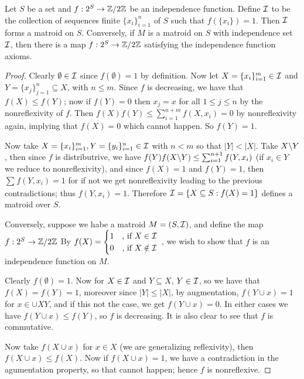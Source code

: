 \begin{theorem}\label{1.1.7}
    Let $S$ be a set and $f:2^S \rightarrow \mathbb{Z}/2\mathbb{Z}$ be an independence function. Define  $\mathcal{I}$ to be
    the collection of sequences finite $\{x_i\}_{i=1}^{n}$ of $S$ such that $f(\{x_i\})=1$. Then
    $\mathcal{I}$ forms a matroid on  $S$. Conversely, if  $M$ is a matroid on  $S$ with independence set
    $\mathcal{I}$, then there is a map $f:2^S \rightarrow \mathbb{Z}/2\mathbb{Z}$ satisfying the independence function
    axioms.
\end{theorem}
\begin{proof}
    Clearly $\emptyset \in \mathcal{I}$ since  $f(\emptyset)=1$ by definition. Now let $X=\{x_i\}_{i=1}^{m}
    \in \mathcal{I}$ and $Y=\{x_j\}_{j=1}^{n} \subseteq X$, with $n \leq m$. Since $f$ is decreasing, we have that  $f(X)
    \leq f(Y)$; now if $f(Y)=0$ then $x_j=x$ for all  $1 \leq j \leq n$ by the nonreflexivity of
    $f$. Then  $f(X)f(Y) \leq \sum_{i=1}^{n+m}{f(X,x_i)}=0$ by nonreflexivity again, implying that
    $f(X)=0$ which cannot happen. So $f(Y)=1$.

    Now take $X=\{x_i\}_{i=1}^{m}, Y=\{y_i\}_{i=1}^{n} \in \mathcal{I}$ with $n<m$ so that  $|Y|<|X|$. Take
    $X\backslash Y$, then since $f$ is distributrive, we have  $f(Y)f(X\backslash Y) \leq
    \sum_{i=1}^{n+1}{f(Y,x_i)}$ (if $x_i \in Y$ we reduce to nonreflexivity), and since $f(X)=1$ and
    $f(Y)=1$, then $\sum_{}{f(Y,x_i)}=1$ for if not we get nonreflexivity leading to the previous
    contradictions; thus $f(Y,x_i)=1$. Therefore $\mathcal{I}=\{X \subseteq S:f(X)=1\}$ defines a matroid 
    over $S$.

    Conversely, suppose we habe a matroid  $M=(S,\mathcal{I})$, and define the map $f:2^S \rightarrow
    \mathbb{Z}/2\mathbb{Z}$ By  $f(X)=\begin{cases}
                        1 & \text{, if } X \in \mathcal{I} \\
                        0 & \text{, if } X \notin \mathcal{I} \\
                      \end{cases}$
    , we wish to show that $f$ is an independence function on $M$.

    Clearly  $f(\emptyset)=1$. Now for $X \in \mathcal{I}$ and  $Y \subseteq X$,  $Y \in \mathcal{I}$, so we have
    that  $f(X)=f(Y)=1$, moreover since $|Y| \leq |X|$, by augmentation,  $f(Y \cup x)=1$ for $x \in
    \cup{X}{Y}$, and if this not the case, we get $f(Y \cup x)=0$. In either cases we have $f(Y \cup x)
    \leq f(Y)$, so $f$ is decreasing. It is also clear to see that  $f$ is commutative.

    Now take  $f(X \cup x)$ for $x \in X$  (we are generalizing reflexivity), then $f(X \cup x) \leq
    f(X)$. Now if $f(X \cup x)=1$, we have a contradiction in the agumentation property, so that
    cannot happen; hence  $f$ is nonreflexive.


\end{proof}

